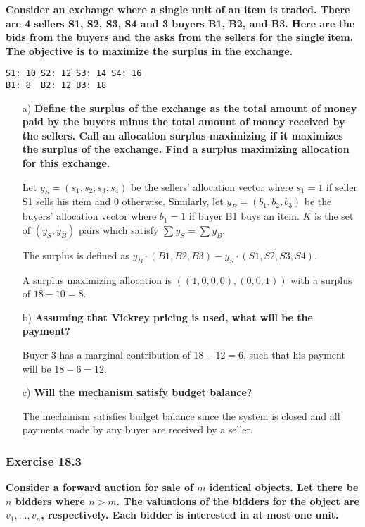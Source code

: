 \documentclass[12pt, a4paper]{article}
\begin{document}
\textbf{Consider an exchange where a single unit of an item is traded. There are 4 sellers S1, S2, S3, S4 and 3 buyers B1, B2, and B3. Here are the bids from the buyers and the asks from the sellers for the single item. The objective is to maximize the surplus in the exchange.}
\begin{verbatim}
S1: 10 S2: 12 S3: 14 S4: 16
B1: 8  B2: 12 B3: 18
\end{verbatim}
\begin{enumerate}
	\item[a)] \textbf{Define the surplus of the exchange as the total amount of money paid by the buyers minus the total amount of money received by the sellers. Call an allocation surplus maximizing if it maximizes the surplus of the exchange. Find a surplus maximizing allocation for this exchange.}

	Let $y_S=(s_1,s_2,s_3,s_4)$ be the sellers' allocation vector where $s_1 = 1$ if seller S1 sells his item and 0 otherwise. Similarly, let $y_B=(b_1, b_2, b_3)$ be the buyers' allocation vector where $b_1 = 1$ if buyer B1 buys an item. $K$ is the set of $(y_S, y_B)$ pairs which satisfy $\sum y_S = \sum y_B$.

	The surplus is defined as $y_B\cdot(B1, B2, B3) - y_S\cdot (S1, S2, S3, S4)$.

	A surplus maximizing allocation is $((1, 0, 0, 0), (0, 0, 1))$ with a surplus of $18 - 10 = 8$.

	\item[b)] \textbf{Assuming that Vickrey pricing is used, what will be the payment?}
	
	Buyer 3 has a marginal contribution of $18 - 12 = 6$, such that his payment will be $18 - 6 = 12$.

	\item[c)] \textbf{Will the mechanism satisfy budget balance?}
	
	The mechanism satisfies budget balance since the system is closed and all payments made by any buyer are received by a seller.

\end{enumerate}
\subsubsection*{Exercise 18.3}

\textbf{Consider a forward auction for sale of $m$ identical objects. Let there be $n$ bidders where $n > m$. The valuations of the bidders for the object are $v_1, ..., v_n$, respectively. Each bidder is interested in at most one unit.}
\end{document}

